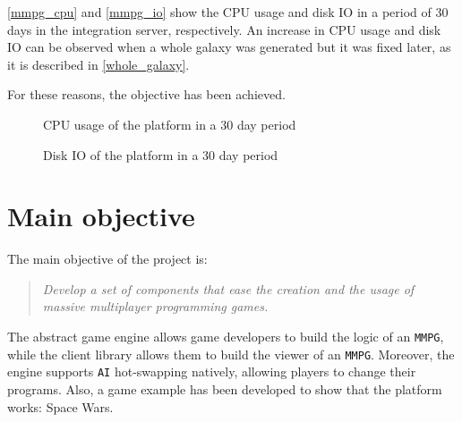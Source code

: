 \documentclass[a4paper,11pt,titlepage,abstract,numbers=noenddot,automark,mnsy,intlimits,rgb,dvipsnames]{report}
\begin{document}
\autoref{mmpg_cpu} and \autoref{mmpg_io} show the CPU usage and disk IO in a period of 30 days in
the integration server, respectively. An increase in CPU usage and disk IO
can be observed when a whole galaxy was generated but it was fixed later, as it is described in \autoref{whole_galaxy}.

For these reasons, the objective has been achieved.
\begin{figure}[H]
\noindent{}
\caption{CPU usage of the platform in a 30 day period}
\label{mmpg_cpu}
\end{figure}
\begin{figure}[H]
\noindent{}
\caption{Disk IO of the platform in a 30 day period}
\label{mmpg_io}
\end{figure}
\section{Main objective}
The main objective of the project is:
\begin{quote}
\emph{Develop a set of components that ease the creation and the usage of massive multiplayer programming games.}
\end{quote}
The abstract game engine allows game developers to build the logic of an \texttt{MMPG}, while the client library allows them
to build the viewer of an \texttt{MMPG}. Moreover, the engine supports \texttt{AI} hot-swapping natively, allowing players to change their
programs. Also, a game example has been developed to show that the platform works: Space Wars.
\end{document}
